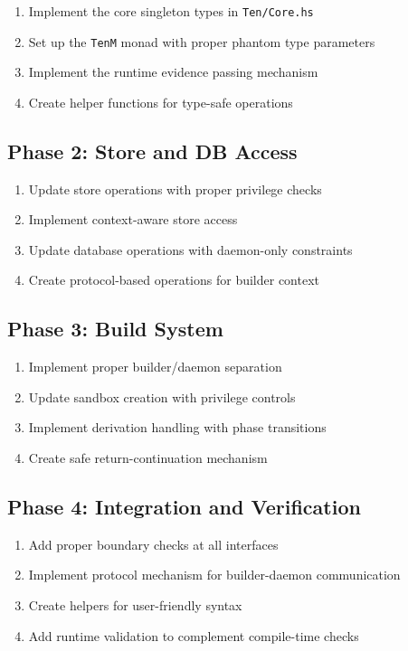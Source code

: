\documentclass{article}
\begin{document}
\begin{enumerate}
    \item Implement the core singleton types in \texttt{Ten/Core.hs}
    \item Set up the \texttt{TenM} monad with proper phantom type parameters
    \item Implement the runtime evidence passing mechanism
    \item Create helper functions for type-safe operations
\end{enumerate}

\subsection{Phase 2: Store and DB Access}

\begin{enumerate}
    \item Update store operations with proper privilege checks
    \item Implement context-aware store access
    \item Update database operations with daemon-only constraints
    \item Create protocol-based operations for builder context
\end{enumerate}

\subsection{Phase 3: Build System}

\begin{enumerate}
    \item Implement proper builder/daemon separation
    \item Update sandbox creation with privilege controls
    \item Implement derivation handling with phase transitions
    \item Create safe return-continuation mechanism
\end{enumerate}

\subsection{Phase 4: Integration and Verification}

\begin{enumerate}
    \item Add proper boundary checks at all interfaces
    \item Implement protocol mechanism for builder-daemon communication
    \item Create helpers for user-friendly syntax
    \item Add runtime validation to complement compile-time checks
\end{enumerate}
\end{document}
